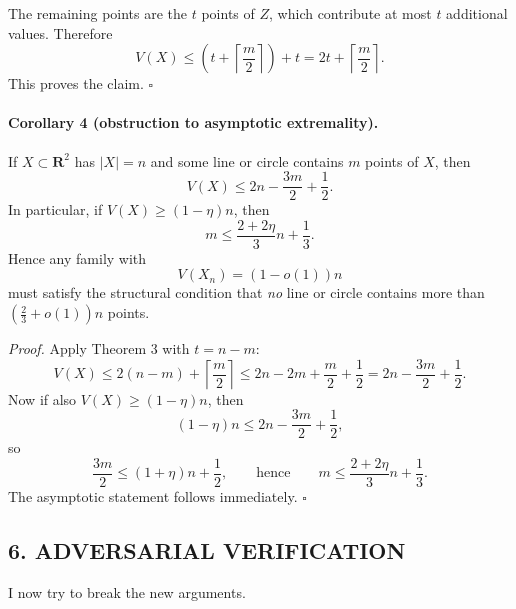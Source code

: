 The remaining points are the \(t\) points of \(Z\), which contribute at most \(t\) additional values.  Therefore
\[
V(X)\le \left(t+\left\lceil\frac{m}{2}\right\rceil\right)+t
=2t+\left\lceil\frac{m}{2}\right\rceil.
\]
This proves the claim. \hfill\(\square\)

\paragraph{Corollary 4 (obstruction to asymptotic extremality).}
If \(X\subset \mathbf{R}^2\) has \(|X|=n\) and some line or circle contains \(m\) points of \(X\), then
\[
V(X)\le 2n-\frac{3m}{2}+\frac12.
\]
In particular, if \(V(X)\ge (1-\eta)n\), then
\[
m\le \frac{2+2\eta}{3}n+\frac13.
\]
Hence any family with
\[
V(X_n)=(1-o(1))n
\]
must satisfy the structural condition that \emph{no} line or circle contains more than \((\tfrac23+o(1))n\) points.

\medskip
\noindent
\textit{Proof.}
Apply Theorem 3 with \(t=n-m\):
\[
V(X)\le 2(n-m)+\left\lceil\frac{m}{2}\right\rceil
\le 2n-2m+\frac{m}{2}+\frac12
=2n-\frac{3m}{2}+\frac12.
\]
Now if also \(V(X)\ge (1-\eta)n\), then
\[
(1-\eta)n\le 2n-\frac{3m}{2}+\frac12,
\]
so
\[
\frac{3m}{2}\le (1+\eta)n+\frac12,
\qquad\text{hence}\qquad
m\le \frac{2+2\eta}{3}n+\frac13.
\]
The asymptotic statement follows immediately. \hfill\(\square\)

\subsection*{6. ADVERSARIAL VERIFICATION}

I now try to break the new arguments.

